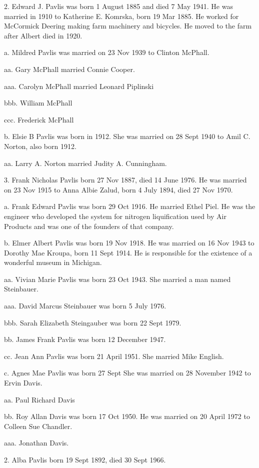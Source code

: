\documentclass[a4paper]{article}
\begin{document}
2. Edward J. Pavlis was born 1 August 1885 and died 7 May 1941.  He was married in 1910 to Katherine E. Komrska, born 19 Mar 1885.  He worked for McCormick Deering making farm machinery and bicycles.  He moved to the farm after Albert died in 1920.  

a. Mildred Pavlis was married on 23 Nov 1939 to Clinton McPhall.

aa. Gary McPhall married Connie Cooper.

aaa. Carolyn McPhall married Leonard Piplinski
		
bbb. William McPhall 

ccc. Frederick McPhall

b. Elsie B Pavlis was born in 1912.  She was married on 28 Sept 1940 to Amil C. Norton, also born 1912. 

aa. Larry A. Norton married Judity A. Cunningham.  

3. Frank Nicholas Pavlis born 27 Nov 1887, died 14 June 1976.  He was married on 23 Nov 1915 to Anna Albie Zalud, born 4 July 1894, died 27 Nov 1970.  

a. Frank Edward Pavlis was born 29 Oct 1916.  He married Ethel Piel. He was the engineer who developed the system for nitrogen liquification used by Air Products and was one of the founders of that company.

b. Elmer Albert Pavlis was born 19 Nov 1918.  He was married on 16 Nov 1943 to Dorothy Mae Kroupa, born 11 Sept 1914.  He is responsible for the existence of a wonderful museum in Michigan.

aa. Vivian Marie Pavlis was born 23 Oct 1943.  She married a man named Steinbauer.

aaa. David Marcus Steinbauer was born 5 July 1976.

bbb. Sarah Elizabeth Steingauber was born 22 Sept 1979.

bb. James Frank Pavlis was born 12 December 1947.

cc. Jean Ann Pavlis was born 21 April 1951.  She married Mike English.  

c. Agnes Mae Pavlis was born 27 Sept She was married on 28 November 1942 to Ervin Davis.  

aa.  Paul Richard Davis

bb. Roy Allan Davis was born 17 Oct 1950.  He was married on 20 April 1972 to Colleen Sue Chandler.  

aaa. Jonathan Davis. 

2. Alba Pavlis born 19 Sept 1892, died 30 Sept 1966.    
\end{document}
